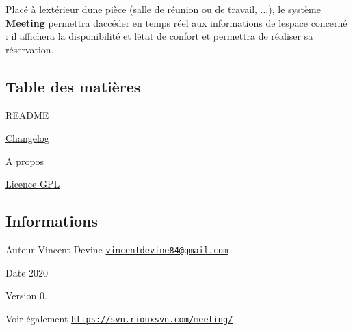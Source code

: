 Placé à l\textquotesingle{}extérieur d\textquotesingle{}une pièce (salle de réunion ou de travail, ...), le système {\bfseries Meeting} permettra d\textquotesingle{}accéder en temps réel aux informations de l\textquotesingle{}espace concerné \+: il affichera la disponibilité et l\textquotesingle{}état de confort et permettra de réaliser sa réservation.\hypertarget{index_section_tdm}{}\subsection{Table des matières}\label{index_section_tdm}

\begin{DoxyItemize}
\item \hyperlink{page__r_e_a_d_m_e}{R\+E\+A\+D\+ME}
\item \hyperlink{page_changelog}{Changelog}
\item \hyperlink{page_about}{A propos}
\item \hyperlink{page_licence}{Licence G\+PL}
\end{DoxyItemize}\hypertarget{index_section_infos}{}\subsection{Informations}\label{index_section_infos}
\begin{DoxyAuthor}{Auteur}
Vincent Devine \href{mailto:vincentdevine84@gmail.com}{\tt vincentdevine84@gmail.\+com} 
\end{DoxyAuthor}
\begin{DoxyDate}{Date}
2020 
\end{DoxyDate}
\begin{DoxyVersion}{Version}
0. 
\end{DoxyVersion}
\begin{DoxySeeAlso}{Voir également}
\href{https://svn.riouxsvn.com/meeting/}{\tt https\+://svn.\+riouxsvn.\+com/meeting/} 
\end{DoxySeeAlso}
